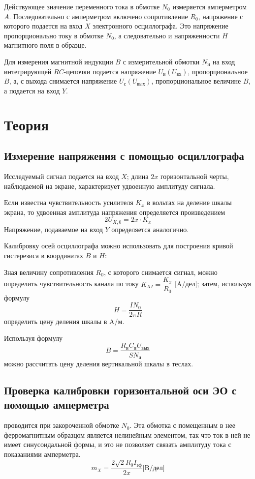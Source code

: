 \documentclass[a4paper, 12pt]{article}%
\begin{document}
Действующее значение переменного тока в обмотке $N_0$ измеряется амперметром $A$. Последовательно с амперметром включено сопротивление $R_0$, напряжение с которого подается на вход $X$ электронного осциллографа. Это напряжение пропорционально току в обмотке $N_0$, а следовательно и напряженности $H$ магнитного поля в образце.

Для измерения магнитной индукции $B$ с измерительной обмотки $N_{\textit{и}}$ на вход интегрирующей $RC$-цепочки подается напряжение $U_{\text{и}}(U_{\textit{вх}})$, пропорциональное $\dot{B}$, а, с выхода снимается напряжение $U_{\textit{с}}(U_{\textit{вых}})$, пропорциональное величине $B$, а подается на вход $Y$.

\section*{Теория}
\subsection*{Измерение напряжения с помощью осциллографа}
Исследуемый сигнал подается на вход $X$; длина $2x$ горизонтальной черты, наблюдаемой на экране, характеризует удвоенную амплитуду сигнала. 

Если известна чувствительность усилителя $K_x$ в вольтах на деление шкалы экрана, то удвоенная амплитуда напряжения определяется произведением
\[2U_{X, 0} = 2x \cdot K_x\]
Напряжение, подаваемое на вход $Y$ определяется аналогично. 

Калибровку осей осциллографа можно использовать для построения кривой гистерезиса в координатах $B$ и $H$:

Зная величину сопротивления $R_0$, с которого снимается сигнал, можно определить чувствительность канала по току $K_{XI} = \dfrac{K_x}{R_0}$ [A/дел]; затем, используя формулу 
\begin{equation}
H = \dfrac{IN_0}{2\pi R}
\end{equation}
определить цену деления шкалы в A/м.

Используя формулу 
\begin{equation}
B = \dfrac{R_{\text{и}}C_{\text{и}}U_{\text{вых}}}{SN_{\text{и}}}
\end{equation}
можно рассчитать цену деления вертикальной шкалы в теслах.
\subsection*{Проверка калибровки горизонтальной оси ЭО с помощью амперметра}
проводится при закороченной обмотке $N_0$. Эта обмотка с помещенным в нее ферромагнитным образцом является нелинейным элементом, так что ток в ней не имеет синусоидальной формы, и это не позволяет связать амплитуду тока с показаниями амперметра.
\begin{equation}
m_X = \dfrac{2 \sqrt{2} R_0 I_{\text{эф}}}{2x} \text{[B/дел]}
\end{equation}
\end{document}
